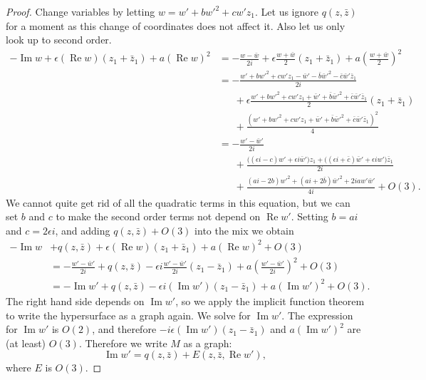 \documentclass[12pt,openany]{book}
\renewcommand{\Re}{\operatorname{Re}}
\renewcommand{\Im}{\operatorname{Im}}
\theoremstyle{plain}
\theoremstyle{remark}
\theoremstyle{definition}
\theoremstyle{exercise}
\theoremstyle{example}
\begin{document}
\begin{proof}
Change variables
by letting $w = w'+bw'^2+cw'z_1$.  Let us ignore $q(z,\bar{z})$ for a moment as
this change of coordinates does not affect it.  Also let us only look up to
second order.
\begin{equation*}
\begin{split}
-\Im w +
\epsilon (\Re w) (z_1+\bar{z}_1)
+
a {(\Re w)}^2
& =
-\frac{w-\bar{w}}{2i} +
\epsilon \frac{w+\bar{w}}{2}(z_1+\bar{z}_1)
+
a{\left(\frac{w+\bar{w}}{2}\right)}^2
\\
& =
-\frac{w'+bw'^2+cw'z_1-\bar{w}'-\bar{b}\bar{w}'^2-\bar{c}\bar{w}'\bar{z}_1}{2i} 
\\
& \phantom{=}~
+\epsilon \frac{w'+bw'^2+cw'z_1+\bar{w}'+\bar{b}\bar{w}'^2+\bar{c}\bar{w}'\bar{z}_1}{2}(z_1+\bar{z}_1)
\\
& \phantom{=}~
+ \frac{{(w'+bw'^2+cw'z_1+\bar{w}'+\bar{b}\bar{w}'^2+\bar{c}\bar{w}'\bar{z}_1)}^2}{4}
\\
& =
-\frac{w'-\bar{w}'}{2i} 
\\
& \phantom{=}~
+\frac{
\bigl((\epsilon i-c)w'
+\epsilon i\bar{w}'\bigr)z_1
+\bigl((\epsilon i+\bar{c})\bar{w}'
+\epsilon iw'\bigr)\bar{z}_1
}{2i}
\\
& \phantom{=}~
+ \frac{(ai-2b)w'^2+(ai+2\bar{b})\bar{w}'^2+2iaw'\bar{w}'}{4i}
+O(3) .
\end{split}
\end{equation*}
We cannot quite get rid of all the quadratic terms in this equation, but we can set
$b$ and $c$ to make the second order terms not depend on $\Re w'$.
Setting $b=ai$ and $c=2\epsilon i$, and adding $q(z,\bar{z}) + O(3)$ into the mix we obtain
\begin{equation*}
\begin{split}
-\Im w & +
q(z,\bar{z}) +
\epsilon (\Re w) (z_1+\bar{z}_1)
+ a{(\Re w)}^2
+O(3)
\\
& =
-\frac{w'-\bar{w}'}{2i} 
+
q(z,\bar{z}) 
- \epsilon i
\frac{w' -\bar{w}'}{2i}
( z_1 -\bar{z}_1)
+ a {\left(\frac{w'-\bar{w}'}{2i}\right)}^2
+O(3)
\\
& =
-\Im w'
+ q(z,\bar{z})
-
\epsilon i
(\Im w')
( z_1 -\bar{z}_1)
+
a {(\Im w')}^2
+O(3) .
\end{split}
\end{equation*}
The right hand side depends on $\Im w'$, so we apply the implicit
function theorem to write the hypersurface as a graph again.
We solve
for $\Im w'$.  The expression for $\Im w'$
is $O(2)$, and therefore $-i\epsilon (\Im w')(z_1-\bar{z}_1)$ 
and $a{(\Im w')}^2$ are (at least) $O(3)$.
Therefore we write $M$ as a graph:
\begin{equation*}
\Im w' = q(z,\bar{z}) + E(z,\bar{z},\Re w'),
\end{equation*}
where $E$ is $O(3)$.


\end{proof}
\end{document}
